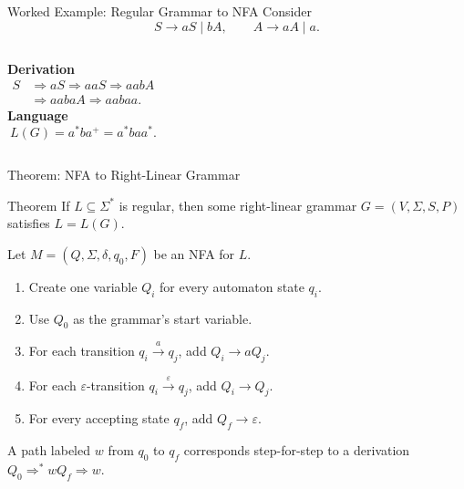 \documentclass[10pt]{beamer}
\begin{document}
\begin{frame}{Worked Example: Regular Grammar to NFA}
  \small
  Consider
  \[
    S\rightarrow aS\mid bA,
    \qquad
    A\rightarrow aA\mid a.
  \]
  \pause
  \begin{center}
  \end{center}
  \pause
  \begin{columns}[T]
    \textbf{Derivation}
    \[
      \begin{aligned}
        S&\Rightarrow aS\Rightarrow aaS\Rightarrow aabA\\
        &\Rightarrow aabaA\Rightarrow aabaa.
      \end{aligned}
    \]
    \textbf{Language}
    \[
      L(G)=a^*ba^+=a^*baa^*.
    \]
  \end{columns}
\end{frame}

\begin{frame}{Theorem: NFA to Right-Linear Grammar}
  \small
  \begin{block}{Theorem}
    If $L\subseteq\Sigma^*$ is regular, then some right-linear grammar
    $G=(V,\Sigma,S,P)$ satisfies $L=L(G)$.
  \end{block}
  \pause
  Let $M=(Q,\Sigma,\delta,q_0,F)$ be an NFA for $L$.
  \begin{enumerate}
    \item Create one variable $Q_i$ for every automaton state $q_i$.
    \item Use $Q_0$ as the grammar's start variable.
    \item For each transition $q_i\xrightarrow{a}q_j$, add
      $Q_i\rightarrow aQ_j$.
    \item For each $\varepsilon$-transition $q_i\xrightarrow{\varepsilon}q_j$, add
      $Q_i\rightarrow Q_j$.
    \item For every accepting state $q_f$, add $Q_f\rightarrow\varepsilon$.
  \end{enumerate}
  \pause
  A path labeled $w$ from $q_0$ to $q_f$ corresponds step-for-step to a
  derivation $Q_0\Rightarrow^*wQ_f\Rightarrow w$.
\end{frame}
\end{document}

